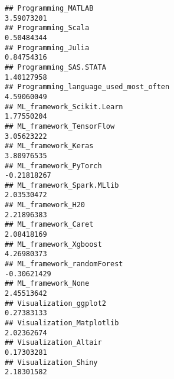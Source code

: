 \documentclass[
]{article}
\begin{document}
\begin{verbatim}
## Programming_MATLAB                                                                                                           3.59073201
## Programming_Scala                                                                                                            0.50484344
## Programming_Julia                                                                                                            0.84754316
## Programming_SAS.STATA                                                                                                        1.40127958
## Programming_language_used_most_often                                                                                         4.59060049
## ML_framework_Scikit.Learn                                                                                                    1.77550204
## ML_framework_TensorFlow                                                                                                      3.05623222
## ML_framework_Keras                                                                                                           3.80976535
## ML_framework_PyTorch                                                                                                        -0.21818267
## ML_framework_Spark.MLlib                                                                                                     2.03530472
## ML_framework_H20                                                                                                             2.21896383
## ML_framework_Caret                                                                                                           2.08418169
## ML_framework_Xgboost                                                                                                         4.26980373
## ML_framework_randomForest                                                                                                   -0.30621429
## ML_framework_None                                                                                                            2.45513642
## Visualization_ggplot2                                                                                                        0.27383133
## Visualization_Matplotlib                                                                                                     2.02362674
## Visualization_Altair                                                                                                         0.17303281
## Visualization_Shiny                                                                                                          2.18301582

\end{verbatim}
\end{document}
